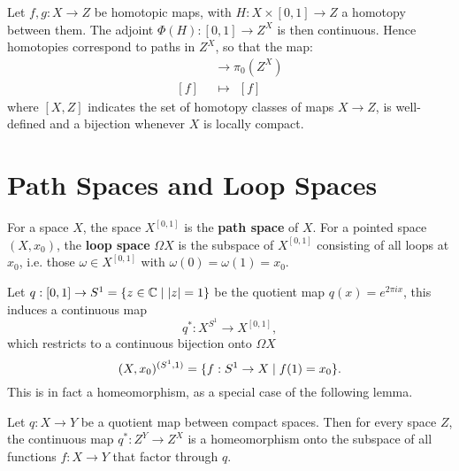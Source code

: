 \begin{example}
Let $f,g:X\to Z$ be homotopic maps, with $H:X\times[0,1]\to Z$ a homotopy between them. The adjoint $\Phi(H):[0,1]\to Z^X$ is then continuous. Hence homotopies correspond to paths in $Z^X$, so that the map:
\begin{align*}
[X,Z]&\to\pi_0(Z^X)\\
[f]\ \ &\mapsto\ \ [f]
\end{align*}
where $[X,Z]$ indicates the set of homotopy classes of maps $X\to Z$, is well-defined and a bijection whenever $X$ is locally compact.
\end{example}

\section{Path Spaces and Loop Spaces}

For a space $X$, the space $X^{[0,1]}$ is the \textbf{path space} of $X$. For a pointed space $(X,x_0)$, the \textbf{loop space} $\Omega X$ is the subspace of $X^{[0,1]}$ consisting of all loops at $x_0$, i.e. those $\omega\in X^{[0,1]}$ with $\omega(0)=\omega(1)=x_0$.

Let $q:[0,1]\to S^1=\{z\in\mathbb{C}\mid|z|=1\}$ be the quotient map $q(x)=e^{2\pi ix}$, this induces a continuous map
\[q^*:X^{S^1}\to X^{[0,1]},\]
which restricts to a continuous bijection onto $\Omega X$
\[(X,x_0)^{(S^1,1)}=\{f:S^1\to X\mid f(1)=x_0\}.\]
This is in fact a homeomorphism, as a special case of the following lemma.

\begin{lemma**}
Let $q:X\to Y$ be a quotient map between compact spaces. Then for every space $Z$, the continuous map $q^*:Z^Y\to Z^X$ is a homeomorphism onto the subspace of all functions $f:X\to Y$ that factor through $q$.
\end{lemma**}
